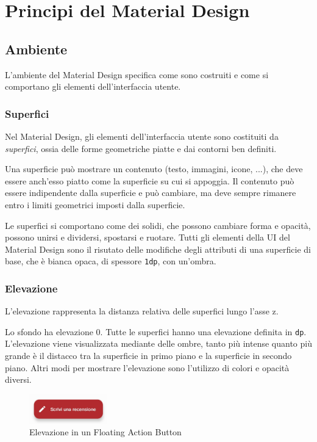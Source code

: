 \documentclass[12pt, a4paper]{report}
\begin{document}
\chapter{Principi del Material Design}

	\section{Ambiente}
	L'ambiente del Material Design  \cite{environment} specifica come sono costruiti e come si comportano gli elementi dell'interfaccia utente.

		\subsection{Superfici}
		Nel Material Design, gli elementi dell'interfaccia utente sono costituiti da \textit{superfici}, ossia delle forme geometriche piatte e dai contorni ben definiti.

		Una superficie può mostrare un contenuto (testo, immagini, icone, ...), che deve essere anch'esso piatto come la superficie su cui si appoggia. Il contenuto può essere indipendente dalla superficie e può cambiare, ma deve sempre rimanere entro i limiti geometrici imposti dalla superficie.

		
		Le superfici si comportano come dei solidi, che possono cambiare forma e opacità, possono unirsi e dividersi, spostarsi e ruotare. Tutti gli elementi della UI del Material Design sono il risutato delle modifiche degli attributi di una superficie di base, che è bianca opaca, di spessore \texttt{1dp}, con un'ombra.
		

		\subsection{Elevazione}
		L'elevazione rappresenta la distanza relativa delle superfici lungo l'asse z.

		Lo sfondo ha elevazione 0. Tutte le superfici hanno una elevazione definita in \texttt{dp}. L'elevazione viene visualizzata mediante delle ombre, tanto più intense quanto più grande è il distacco tra la superficie in primo piano e la superficie in secondo piano. Altri modi per mostrare l'elevazione sono l'utilizzo di colori e opacità diversi.

		\begin{figure}[h]
   			\centering
   			\includegraphics[width=0.3\textwidth]{elevation}
 			\caption{Elevazione in un Floating Action Button}
    			\label{fig:mesh1}
		\end{figure}
\end{document}
